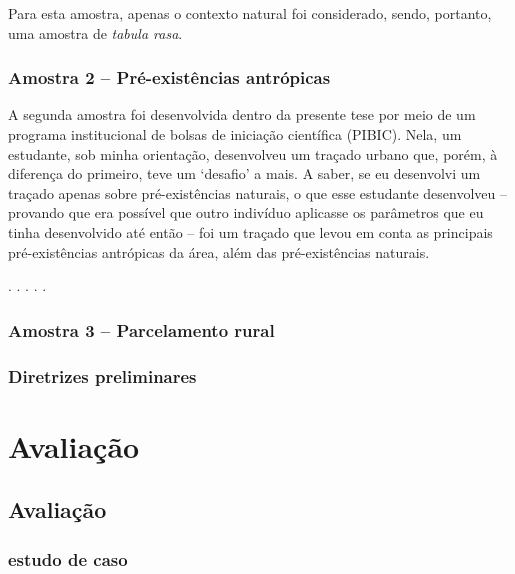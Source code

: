 \documentclass[12pt, a4paper]{book} %
\begin{document}
        Para esta amostra, apenas o contexto natural foi considerado, sendo, portanto, uma amostra de \textit{tabula rasa}.




            \section{Amostra 2 – Pré-existências antrópicas}
        A segunda amostra foi desenvolvida dentro da presente tese por meio de um programa institucional de bolsas de iniciação científica (PIBIC). Nela, um estudante, sob minha orientação, desenvolveu um traçado urbano que, porém, à diferença do primeiro, teve um `desafio' a mais. A saber, se eu desenvolvi um traçado apenas sobre pré-existências naturais, o que esse estudante desenvolveu – provando que era possível que outro indivíduo aplicasse os parâmetros que eu tinha desenvolvido até então – foi um traçado que levou em conta as principais pré-existências antrópicas da área, além das pré-existências naturais.

        \begin{center}
            . . . . .
        \end{center} 

            \section{Amostra 3 – Parcelamento rural}
            \section{Diretrizes preliminares}



    \part[Avaliação]{Avaliação}

        \chapter[Avaliação]{Avaliação}
            \section[Comparativo com existente]{estudo de caso}

            \section[Grupo focal e \textit{feedback}]{}
\end{document}
